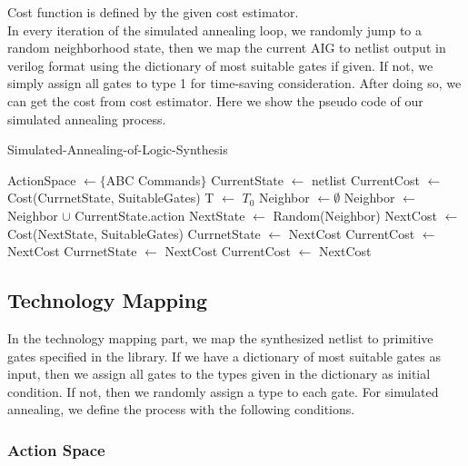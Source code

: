 \documentclass[conference]{IEEEtran}
\begin{document}
Cost function is defined by the given cost estimator.\\

In every iteration of the simulated annealing loop, we randomly jump to a random neighborhood state, then we map the current AIG to netlist output in verilog format using the dictionary of most suitable gates if given. If not, we simply assign all gates to type 1 for time-saving consideration. After doing so, we can get the cost from cost estimator. Here we show the pseudo code of our simulated annealing process.

\begin{algorithm}
\begin{algorithmic}[1]
    \caption{Simulated-Annealing-of-Logic-Synthesis}\label{euclid}
    \State ActionSpace $ \gets \{ $ABC Commands$ \}$
    \State CurrentState $\gets$ netlist
    \State CurrentCost $\gets$ Cost(CurrnetState, SuitableGates)
    \State T $\gets$ $T_0$
        \State Neighbor $\gets \emptyset$
            \State Neighbor $\gets$ Neighbor $\cup$ CurrentState.action
        \EndFor
        \State NextState $\gets$ Random(Neighbor)
        \State NextCost $\gets$ Cost(NextState, SuitableGates)
            \State CurrnetState $\gets$ NextCost
            \State CurrentCost $\gets$ NextCost
            \State CurrnetState $\gets$ NextCost
            \State CurrentCost $\gets$ NextCost
        \EndIf
    \EndWhile
\end{algorithmic}
\end{algorithm}

\subsection{Technology Mapping}

In the technology mapping part, we map the synthesized netlist to primitive gates specified in the library. If we have a dictionary of most suitable gates as input, then we assign all gates to the types given in the dictionary as initial condition. If not, then we randomly assign a type to each gate. For simulated annealing, we define the process with the following conditions.\\


\subsubsection{Action Space}
\end{document}
